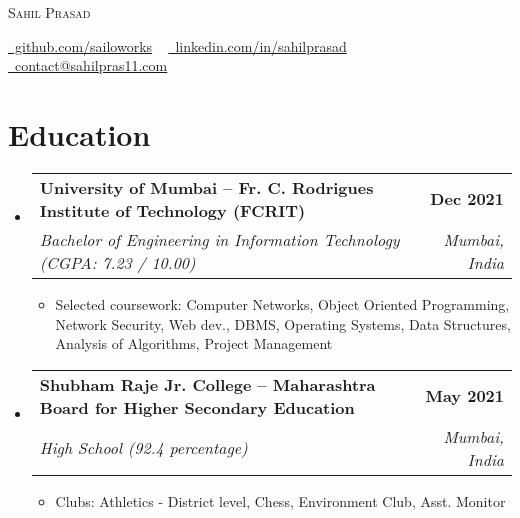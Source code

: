 \documentclass[letterpaper,11pt]{article}
\makeatletter
\newcommand{\resumeItem}[1]{
  \item\small{
    {#1 \vspace{-2pt}}
  }
}
\newcommand{\resumeSubheading}[4]{
  \vspace{-2pt}\item
    \begin{tabular*}{1.0\textwidth}[t]{l@{\extracolsep{\fill}}r}
      \vspace{-2pt}\textbf{#1} & \textbf{\small #2} \\
      \textit{\small#3} & \textit{\small #4} \\
    \end{tabular*}\vspace{-7pt}
}
\newcommand{\resumeSubHeadingListStart}{\begin{itemize}[leftmargin=0.0in, label={}]}
\newcommand{\resumeSubHeadingListEnd}{\end{itemize}}
\newcommand{\resumeItemListStart}{\begin{itemize}}
\newcommand{\resumeItemListEnd}{\end{itemize}\vspace{-5pt}}
\makeatother
\begin{document}

\begin{center}
    {\huge \scshape Sahil Prasad} \\ \vspace{1pt}
    \small
    
    \faGithub \href{https://github.com/sailorworks}{\raisebox{-0.2\height}\ github.com/sailoworks} ~
    \faLinkedin \href{https://www.linkedin.com/in/sahil-prasad-/}{\raisebox{-0.2\height}\ linkedin.com/in/sahilprasad} ~
    \faEnvelope \href{mailto:sahilpras11@gmail.com}{\raisebox{-0.2\height}\  contact@sahilpras11.com}
    \vspace{-13pt}
\end{center}


\section{Education}
    \vspace{-2pt}
    \resumeSubHeadingListStart
        \resumeSubheading
            {University of Mumbai --  Fr. C. Rodrigues Institute of Technology (FCRIT)}{Dec 2021}
            {Bachelor of Engineering in Information Technology (CGPA: 7.23 / 10.00)}{Mumbai, India}
            \resumeItemListStart
                \resumeItem{Selected coursework: Computer Networks, Object Oriented Programming, Network Security, Web dev., DBMS, Operating Systems, Data Structures, Analysis of Algorithms, Project Management}
            \resumeItemListEnd
        \vspace{-3pt}

        \resumeSubheading
            {Shubham Raje Jr. College -- Maharashtra Board for Higher Secondary Education}{May 2021}
            {High School (92.4 percentage)}{Mumbai, India}
            \resumeItemListStart
                \resumeItem{Clubs: Athletics - District level, Chess, Environment Club, Asst. Monitor}
            \resumeItemListEnd
    \resumeSubHeadingListEnd
\vspace{-19pt}
\end{document}
